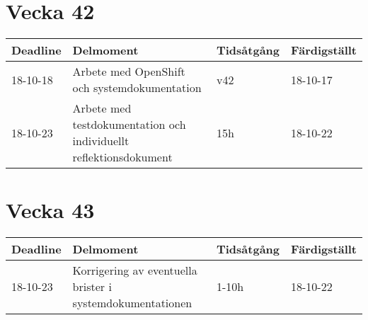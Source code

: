 \documentclass{TDP003mall}
\begin{document}
\section{Vecka 42}
\begin{table}[!h]
\begin{tabularx}{\linewidth}{|l|X|l|l|}
\hline
\textbf{Deadline} & \textbf{Delmoment} & \textbf{Tidsåtgång} & \textbf{Färdigställt}\\\hline
18-10-18 & Arbete med OpenShift och systemdokumentation & v42 & 18-10-17\\\hline
18-10-23 & Arbete med testdokumentation och individuellt reflektionsdokument & 15h & 18-10-22\\\hline
\end{tabularx}
\end{table}

\section{Vecka 43}
\begin{table}[!h]
\begin{tabularx}{\linewidth}{|l|X|l|l|}
\hline
\textbf{Deadline} & \textbf{Delmoment} & \textbf{Tidsåtgång} & \textbf{Färdigställt}\\\hline
18-10-23 & Korrigering av eventuella brister i systemdokumentationen & 1-10h & 18-10-22\\\hline
\end{tabularx}
\end{table}
\end{document}
